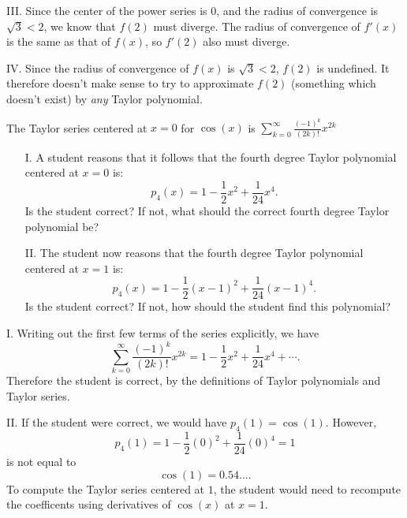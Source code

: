 \documentclass[]{ximera}
\begin{document}
\begin{problem}
\begin{solution}
III. Since the center of the power series is $0$, and the radius of convergence is $\sqrt{3} < 2$, we know that $f(2)$ must diverge. The radius of convergence of $f'(x)$ is the same as that of $f(x)$, so $f'(2)$ also must diverge.

IV. Since the radius of convergence of $f(x)$ is $\sqrt{3} < 2$, $f(2)$ is undefined. It therefore doesn't make sense to try to approximate $f(2)$ (something which doesn't exist) by \emph{any} Taylor polynomial.
\end{solution}
\end{problem}


\begin{problem} 
The Taylor series centered at $x=0$ for $\cos(x)$ is $\displaystyle \sum_{k=0}^{\infty} \frac{(-1)^k}{(2k)!} x^{2k}$

\begin{itemize}
\item[I.]  A student reasons that it follows that the fourth degree Taylor polynomial centered at $x=0$ is: $$p_4(x) = 1-\dfrac{1}{2}x^2+\dfrac{1}{24}x^4.$$  Is the student correct?  If not, what should the correct fourth degree Taylor polynomial be?
\item[II.] The student now reasons that the fourth degree Taylor polynomial centered at $x=1$ is: $$p_4(x) = 1-\dfrac{1}{2}(x-1)^2+\dfrac{1}{24}(x-1)^4.$$  Is the student correct?  If not, how should the student find this polynomial?
\end{itemize}

\begin{solution}
I. Writing out the first few terms of the series explicitly, we have
$$
\sum_{k=0}^{\infty} \frac{(-1)^k}{(2k)!} x^{2k} = 1 - \frac{1}{2} x^2 + \frac{1}{24}x^4 + \cdots.
$$
Therefore the student is correct, by the definitions of Taylor polynomials and Taylor series.

II. If the student were correct, we would have $p_4(1) = \cos(1)$. However,
$$
p_4(1) = 1 - \frac{1}{2}(0)^2 + \frac{1}{24}(0)^4 = 1
$$
is not equal to 
$$
\cos(1) = 0.54\ldots.
$$
To compute the Taylor series centered at $1$, the student would need to recompute the coefficents using derivatives of $\cos(x)$ at $x=1$. 
\end{solution}
\end{problem}
\end{document}
